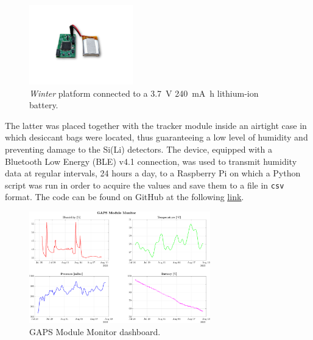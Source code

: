 \begin{figure}[h!]
    \centering
    \includegraphics[width=0.4\textwidth]{Images/chap3/winter_battery.pdf}
    \caption{\textit{Winter} platform connected to a \SI{3.7}{\volt} \SI{240}{\milli\ampere h} lithium-ion battery.}
    \label{figWinterBattery}
\end{figure}

\par
The latter was placed together with the tracker module inside an airtight case in which desiccant bags were located, thus guaranteeing a low level of humidity and preventing damage to the Si(Li) detectors. The device, equipped with a Bluetooth Low Energy (BLE) v4.1 connection, was used to transmit humidity data at regular intervals, 24 hours a day, to a Raspberry Pi on which a Python script was run in order to acquire the values and save them to a file in \texttt{csv} format. The code can be found on GitHub at the following \href{https://github.com/lucaghislo/winter_enviroment_monitor}{\underline{link}}. 

\begin{figure}[h!]
    \centering
    \includegraphics[width=0.7\textwidth]{Images/chap3/winter_plot.pdf} 
    \caption{GAPS Module Monitor dashboard.}
    \label{figWinterMATLABmonitor}
\end{figure}

